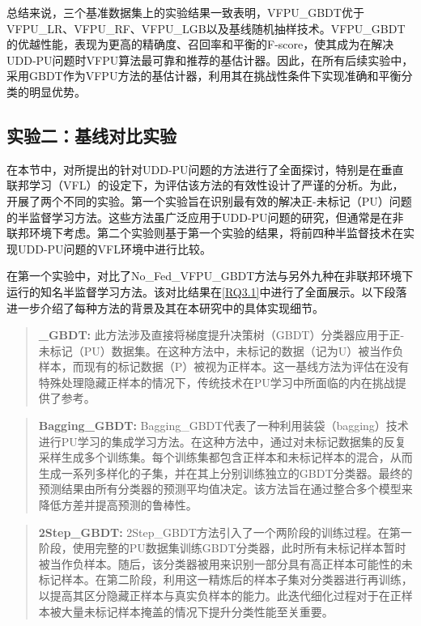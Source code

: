 总结来说，三个基准数据集上的实验结果一致表明，VFPU\_GBDT优于VFPU\_LR、VFPU\_RF、VFPU\_LGB以及基线随机抽样技术。VFPU\_GBDT的优越性能，表现为更高的精确度、召回率和平衡的F-score，使其成为在解决UDD-PU问题时VFPU算法最可靠和推荐的基估计器。因此，在所有后续实验中，采用GBDT作为VFPU方法的基估计器，利用其在挑战性条件下实现准确和平衡分类的明显优势。

\subsection{实验二：基线对比实验}

在本节中，对所提出的针对UDD-PU问题的方法进行了全面探讨，特别是在垂直联邦学习（VFL）的设定下，为评估该方法的有效性设计了严谨的分析。为此，开展了两个不同的实验。第一个实验旨在识别最有效的解决正-未标记（PU）问题的半监督学习方法。这些方法虽广泛应用于UDD-PU问题的研究，但通常是在非联邦环境下考虑。第二个实验则基于第一个实验的结果，将前四种半监督技术在实现UDD-PU问题的VFL环境中进行比较。

在第一个实验中，对比了No\_Fed\_VFPU\_GBDT方法与另外九种在非联邦环境下运行的知名半监督学习方法。该对比结果在\autoref{RQ3.1}中进行了全面展示。以下段落进一步介绍了每种方法的背景及其在本研究中的具体实现细节。

\begin{quote}
	\textbf{\_GBDT:} 此方法涉及直接将梯度提升决策树（GBDT）分类器应用于正-未标记（PU）数据集。在这种方法中，未标记的数据（记为U）被当作负样本，而现有的标记数据（P）被视为正样本。这一基线方法为评估在没有特殊处理隐藏正样本的情况下，传统技术在PU学习中所面临的内在挑战提供了参考。
\end{quote}

\begin{quote}
	\textbf{Bagging\_GBDT:} Bagging\_GBDT代表了一种利用装袋（bagging）技术进行PU学习的集成学习方法。在这种方法中，通过对未标记数据集的反复采样生成多个训练集。每个训练集都包含正样本和未标记样本的混合，从而生成一系列多样化的子集，并在其上分别训练独立的GBDT分类器。最终的预测结果由所有分类器的预测平均值决定。该方法旨在通过整合多个模型来降低方差并提高预测的鲁棒性。
\end{quote}

\begin{quote}
	\textbf{2Step\_GBDT:} 2Step\_GBDT方法引入了一个两阶段的训练过程。在第一阶段，使用完整的PU数据集训练GBDT分类器，此时所有未标记样本暂时被当作负样本。随后，该分类器被用来识别一部分具有高正样本可能性的未标记样本。在第二阶段，利用这一精炼后的样本子集对分类器进行再训练，以提高其区分隐藏正样本与真实负样本的能力。此迭代细化过程对于在正样本被大量未标记样本掩盖的情况下提升分类性能至关重要。
\end{quote}

